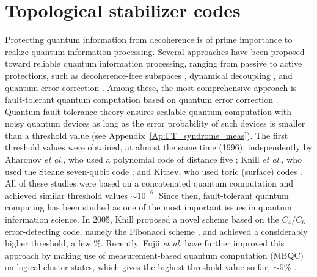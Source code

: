 \chapter{Topological stabilizer codes}
\label{Chap:TpologicalCodes}
Protecting quantum information from decoherence is of prime importance to realize quantum information processing.
Several approaches have been proposed toward reliable quantum information processing, ranging from passive to active protections, such as decoherence-free subspaces
\cite{DFS}, dynamical decoupling \cite{DD}, and quantum error correction \cite{Shor95}.
Among these, the most comprehensive approach is fault-tolerant quantum computation based on quantum error correction \cite{DiViShor}.
Quantum fault-tolerance theory ensures scalable quantum computation with noisy quantum devices as long as the error probability of such devices is smaller than a threshold value (see Appendix~\ref{Ap:FT_syndrome_meas}). 
The first threshold values were obtained, at almost the same time (1996), independently by Aharonov {\it et al.}, who used a polynomial code of distance five \cite{Aharonov97,Aharonov08}; Knill {\it et al.}, who used the Steane seven-qubit code \cite{Knill98a,Knill98b}; and Kitaev, who used toric (surface) codes \cite{Kitaev97}.
All of these studies were based on a concatenated quantum computation and achieved similar threshold values $\sim 10^{-6}$. 
Since then, fault-tolerant quantum computing has been studied as one of the most important issues in quantum information science.
In 2005, Knill proposed a novel scheme based on the $C_4/C_6$ error-detecting code, namely the Fibonacci scheme \cite{KnillNature}, and achieved a considerably higher threshold, a few \%. 
Recently, Fujii {\it et al.} have further improved this approach by making use of measurement-based quantum computation (MBQC) \cite{RaussendorfAnn,RaussendorfNJP} on logical cluster states, which gives the highest threshold value so far, $\sim 5\%$ \cite{FYCluster,FYClusterTopo}.


